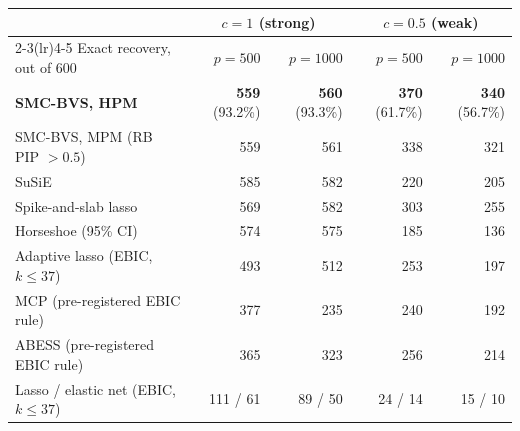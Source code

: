 \documentclass[10pt]{article}
\begin{document}
\begin{center}\small
\begin{tabular}{@{}lrrrr@{}}
\toprule
 & \multicolumn{2}{c}{$c=1$ (strong)} & \multicolumn{2}{c}{$c=0.5$ (weak)}\\
\cmidrule(lr){2-3}\cmidrule(lr){4-5}
Exact recovery, out of 600 & $p=500$ & $p=1000$ & $p=500$ & $p=1000$\\
\midrule

\textbf{SMC-BVS, HPM} & \textbf{559} (93.2\%) & \textbf{560} (93.3\%) & \textbf{370} (61.7\%) & \textbf{340} (56.7\%)\\
SMC-BVS, MPM (RB PIP $>0.5$) & 559 & 561 & 338 & 321\\
SuSiE & 585 & 582 & 220 & 205\\
Spike-and-slab lasso & 569 & 582 & 303 & 255\\
Horseshoe (95\% CI) & 574 & 575 & 185 & 136\\
Adaptive lasso (EBIC, $k\le37$) & 493 & 512 & 253 & 197\\
MCP (pre-registered EBIC rule) & 377 & 235 & 240 & 192\\
ABESS (pre-registered EBIC rule) & 365 & 323 & 256 & 214\\
Lasso / elastic net (EBIC, $k\le37$) & 111 / 61 & 89 / 50 & 24 / 14 & 15 / 10\\
\bottomrule
\end{tabular}
\end{center}
\vspace{-6pt}
\end{document}

